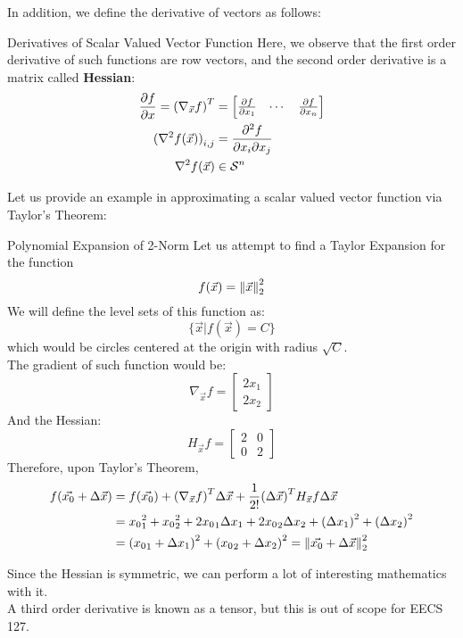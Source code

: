 In addition, we define the derivative of vectors as follows:
\begin{ln-define}{Derivatives of Scalar Valued Vector Function}{}
    Here, we observe that the first order derivative of such functions are row vectors, and the second order derivative is a matrix called \textbf{Hessian}:
    \begin{align*}
        \pdv{f}{x} = {(\nabla_{\vec{x}}f)}^T &= \begin{bmatrix} \pdv{f}{x_1} & \cdots & \pdv{f}{x_n} \end{bmatrix} \\
        {(\nabla^2 f(\vec{x}))}_{i,j} &= \pdv{f}{x_i}{x_j} \\
        \nabla^2 f(\vec{x}) &\in \mathcal{S}^n
    \end{align*}
\end{ln-define}
Let us provide an example in approximating a scalar valued vector function via Taylor's Theorem:
\begin{ln-explain}{Polynomial Expansion of 2-Norm}{}
    Let us attempt to find a Taylor Expansion for the function
    \[f(\vec{x}) = \pnorm[2]{\vec{x}}{2}\]
    We will define the level sets of this function as:
    \[
        \{\vec{x} \big| f(\vec{x}) = C\}
    \]
    which would be circles centered at the origin with radius $\sqrt{C}$. \\
    The gradient of such function would be:
    \[
        \nabla_{\vec{x}}f = \begin{bmatrix} 2x_1 \\ 2x_2 \end{bmatrix}
    \]
    And the Hessian:
    \[
        H_{\vec{x}}f = \begin{bmatrix} 2 & 0 \\ 0 & 2 \end{bmatrix}
    \]
    Therefore, upon Taylor's Theorem,
    \begin{align*}
        f(\vec{x_0} + \Delta \vec{x})
        &= f(\vec{x_0}) + {(\nabla_{\vec{x}}f)}^T \Delta \vec{x} + \frac{1}{2!} {(\Delta \vec{x})}^T H_{\vec{x}}f \Delta \vec{x} \\
        &= {x_0}_1^2 + {x_0}_2^2 + 2{x_0}_1 \Delta x_1 + 2{x_0}_2 \Delta x_2 + {(\Delta x_1)}^2 + {(\Delta x_2)}^2 \\
        &= {({x_0}_1 + \Delta x_1)}^2 + {({x_0}_2 + \Delta x_2)}^2 = \pnorm[2]{\vec{x_0} + \Delta \vec{x}}{2}
    \end{align*}
\end{ln-explain}
Since the Hessian is symmetric, we can perform a lot of interesting mathematics with it. \\
A third order derivative is known as a tensor, but this is out of scope for EECS 127.

